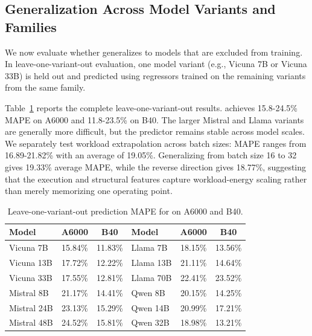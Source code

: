 \subsection{Generalization Across Model Variants and Families}
We now evaluate whether \sys{} generalizes to models that are excluded from training.
In leave-one-variant-out evaluation, one model variant (e.g., Vicuna 7B or Vicuna 33B) is held out and predicted using regressors trained on the remaining variants from the same family.

Table~\ref{tab:variant_generalization_combined} reports the complete leave-one-variant-out results. \sys{} achieves 15.8-24.5\% MAPE on A6000 and 11.8-23.5\% on B40. The larger Mistral and Llama variants are generally more difficult, but the predictor remains stable across model scales. We separately test workload extrapolation across batch sizes: MAPE ranges from 16.89-21.82\% with an average of 19.05\%. Generalizing from batch size 16 to 32 gives 19.33\% average MAPE, while the reverse direction gives 18.77\%, suggesting that the execution and structural features capture workload-energy scaling rather than merely memorizing one operating point.

\begin{table}[t]
\centering
\small
\setlength{\tabcolsep}{2.5pt}
\renewcommand{\arraystretch}{1.05}
\begin{tabular}{@{}lcc|lcc@{}}
\toprule
\textbf{Model} & \textbf{A6000} & \textbf{B40} & \textbf{Model} & \textbf{A6000} & \textbf{B40} \\
\midrule
\rowcolor{rowblue} Vicuna 7B & 15.84\% & 11.83\% & Llama 7B & 18.15\% & 13.56\% \\
Vicuna 13B & 17.72\% & 12.22\% & Llama 13B & 21.11\% & 14.64\% \\
\rowcolor{rowblue} Vicuna 33B & 17.55\% & 12.81\% & Llama 70B & 22.41\% & 23.52\% \\
Mistral 8B & 21.17\% & 14.41\% & Qwen 8B & 20.15\% & 14.25\% \\
\rowcolor{rowblue} Mistral 24B & 23.13\% & 15.29\% & Qwen 14B & 20.99\% & 17.21\% \\
Mistral 48B & 24.52\% & 15.81\% & Qwen 32B & 18.98\% & 13.21\% \\
\bottomrule
\end{tabular}
\vspace{5pt}
\caption{Leave-one-variant-out prediction MAPE for \sys{} on A6000 and B40.}
\label{tab:variant_generalization_combined}
\vspace{-5pt}
\end{table}

